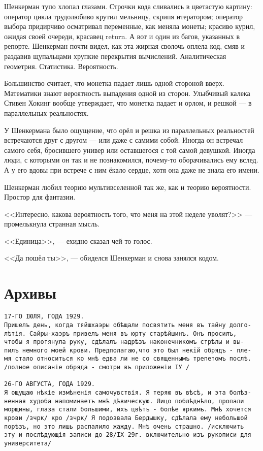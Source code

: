 \documentclass[a4paper,10pt,fleqn]{book}\usepackage{polyglossia}\setdefaultlanguage{english}\setotherlanguage{russian}\defaultfontfeatures{Ligatures=TeX,Mapping=tex-text} \usepackage{xcolor}\definecolor{lightgray}{HTML}{bbbbbb}\color{lightgray}\newcommand{\ml}[3]{\textcolor{black}{#3}}
\begin{document}
Шенкерман тупо хлопал глазами.
Строчки кода сливались в цветастую картину: оператор цикла трудолюбиво крутил мельницу, скрипя итератором;
оператор выбора придирчиво осматривал переменные, как меняла монеты;
красиво курил, ожидая своей очереди, красавец return.
А вот и один из багов, указанных в репорте.
Шенкерман почти видел, как эта жирная сволочь оплела код, смяв и раздавив щупальцами хрупкие перекрытия вычислений.
Аналитическая геометрия.
Статистика.
Вероятность.

Большинство считает, что монетка падает лишь одной стороной вверх.
Математики знают вероятность выпадения одной из сторон.
Улыбчивый калека Стивен Хокинг вообще утверждает, что монетка падает и орлом, и решкой --- в параллельных реальностях.

У Шенкермана было ощущение, что орёл и решка из параллельных реальностей встречаются друг с другом --- или даже с самими собой.
Иногда он встречал самого себя, бросившего универ или оставшегося с той самой девушкой.
Иногда люди, с которыми он так и не познакомился, почему-то оборачивались ему вслед.
А у его вдовы при встрече с ним ёкало сердце, хотя она даже не знала его имени.

Шенкерман любил теорию мультивселенной так же, как и теорию вероятности.
Простор для фантазии.

<<Интересно, какова вероятность того, что меня на этой неделе уволят?>> --- промелькнула странная мысль.

<<Единица>>, --- ехидно сказал чей-то голос.

<<Да пошёл ты>>, --- обиделся Шенкерман и снова занялся кодом.

\section{Архивы}


\begin{verbatim}
17-ГО IЮЛЯ, ГОДА 1929.
Пришелъ день, когда тяйшхаэры обѣщали посвятить меня въ тайну долго-
лѣтія. Сайры-хаэръ привелъ меня въ юрту старѣйшинъ. Онъ просилъ,
чтобы я протянула руку, сдѣлалъ надрѣзъ наконечникомъ стрѣлы и вы-
пилъ немного моей крови. Предполагаю,что это был некiй обрядъ - пле-
мя стало относиться ко мнѣ едва ли не со священнымъ трепетомъ послѣ.
/полное описаніе обряда - смотри въ приложеніи IУ /

26-ГО АВГУСТА, ГОДА 1929.
Я ощущаю нѣкіе измѣненія самочувствія. Я теряю въ вѣсѣ, и эта болѣз-
ненная худоба напоминаетъ мнѣ дѣвическую. Лицо поблѣднѣло, пропали
морщины, глаза стали большими, ихъ цвѣтъ - болѣе яркимъ. Мнѣ хочется
крови /зчрк/ кро /зчрк/ Я подозвала Бердышку, сдѣлала ему небольшой
порѣзъ, но это лишь распалило жажду. Мнѣ очень страшно. /исключить
эту и послѣдующія записи до 28/IX-29г. включительно изъ рукописи для
университета/
\end{verbatim}
\end{document}
